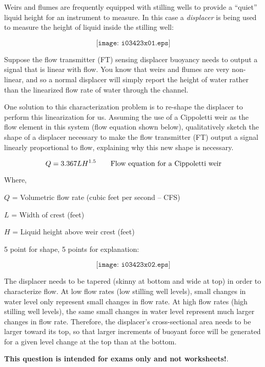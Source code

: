 

Weirs and flumes are frequently equipped with stilling wells to provide a ``quiet'' liquid height for an instrument to measure.  In this case a {\it displacer} is being used to measure the height of liquid inside the stilling well:

$$\texttt{[image: i03423x01.eps]}$$

Suppose the flow transmitter (FT) sensing displacer buoyancy needs to output a signal that is linear with flow.  You know that weirs and flumes are very non-linear, and so a normal displacer will simply report the height of water rather than the linearized flow rate of water through the channel.

\vskip 10pt

One solution to this characterization problem is to re-shape the displacer to perform this linearization for us.  Assuming the use of a Cippoletti weir as the flow element in this system (flow equation shown below), qualitatively sketch the shape of a displacer necessary to make the flow transmitter (FT) output a signal linearly proportional to flow, explaining why this new shape is necessary.

$$Q = 3.367 L H^{1.5} \hbox{\hskip 20pt Flow equation for a Cippoletti weir}$$

\noindent
Where,

$Q$ = Volumetric flow rate (cubic feet per second -- CFS)

$L$ = Width of crest (feet)

$H$ = Liquid height above weir crest (feet)

\vskip 10pt


\vskip 50pt







5 point for shape, 5 points for explanation:

$$\texttt{[image: i03423x02.eps]}$$

The displacer needs to be tapered (skinny at bottom and wide at top) in order to characterize flow.  At low flow rates (low stilling well levels), small changes in water level only represent small changes in flow rate.  At high flow rates (high stilling well levels), the same small changes in water level represent much larger changes in flow rate.  Therefore, the displacer's cross-sectional area needs to be larger toward its top, so that larger increments of buoyant force will be generated for a given level change at the top than at the bottom. 







{\bf This question is intended for exams only and not worksheets!}.


